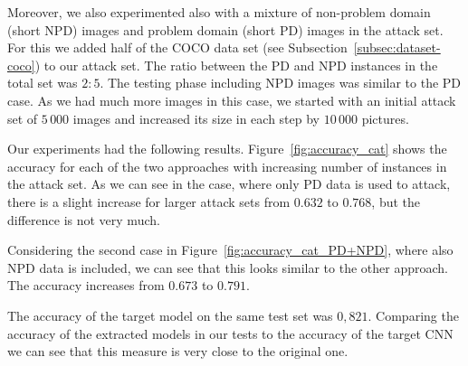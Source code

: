 \documentclass[a4paper,11pt]{article}
\begin{document}
        Moreover, we also experimented also with a mixture of non-problem domain (short NPD) images and problem domain (short PD) images in the attack set. For this we added half of the COCO data set (see Subsection~\ref{subsec:dataset-coco}) to our attack set. The ratio between the PD and NPD instances in the total set was $2:5$.
        The testing phase including NPD images was similar to the PD case. As we had much more images in this case, we started with an initial attack set of $5\,000$ images and increased its size in each step by $10\,000$ pictures.
        
        Our experiments had the following results. Figure~\ref{fig:accuracy_cat} shows the accuracy for each of the two approaches with increasing number of instances in the attack set. As we can see in the case, where only PD data is used to attack, there is a slight increase for larger attack sets from $0.632$ to $0.768$, but the difference is not very much. 
        
        Considering the second case in Figure~\ref{fig:accuracy_cat_PD+NPD}, where also NPD data is included, we can see that this looks similar to the other approach. The accuracy increases from $0.673$ to $0.791$.
        
        The accuracy of the target model on the same test set was $0,821$. 
        Comparing the accuracy of the extracted models in our tests to the accuracy of the target CNN we can see that this measure is very close to the original one.
        
\end{document}
